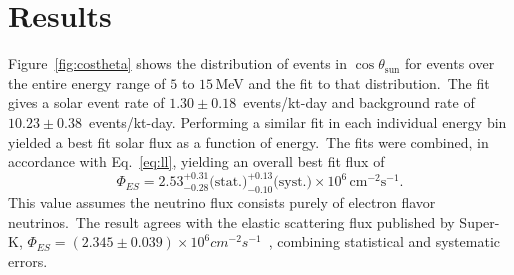 \section{Results}
Figure~\ref{fig:costheta} shows the distribution of events in $\cos\theta_\text{{sun}}$
for events over the entire energy range of $5$ to $15$\,MeV and the fit to that distribution.\
The fit gives a solar event rate of $1.30\pm0.18$~events/kt-day
 and background rate of  $10.23\pm0.38$~events/kt-day.
Performing a similar fit in each individual energy bin yielded a best fit solar flux
as a function of energy.\
The fits were combined, in accordance with Eq.~\ref{eq:ll}, yielding an overall best fit flux of
\begin{equation*}
    \Phi_{ES}= 2.53^{+0.31}_{-0.28}\text{(stat.)}^{+0.13}_{-0.10}\text{(syst.)}\times10^6\,\text{cm}^{-2}\text{s}^{-1}\text{.}
\end{equation*}
This value assumes the neutrino flux consists purely of electron flavor neutrinos.\
The result agrees with the elastic scattering flux published by Super-K,
$\Phi_{ES}=\left(2.345\pm0.039\right)\times10^{6}cm^{-2}s^{-1}$~\cite{superk4},
combining statistical and systematic errors.\


